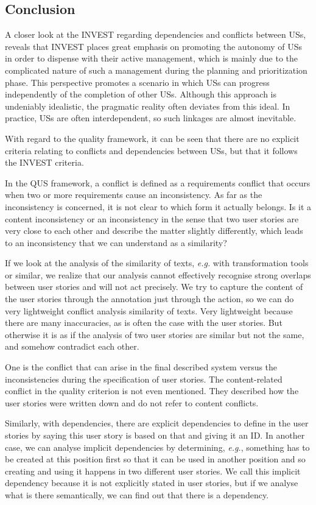 \subsection{Conclusion} \label{usq_conclusion}
A closer look at the INVEST regarding dependencies and conflicts between USs, reveals that INVEST places great emphasis on promoting the autonomy of USs in order to dispense with their active management, which is mainly due to the complicated nature of such a management during the planning and prioritization phase. This perspective promotes a scenario in which USs can progress independently of the completion of other USs. Although this approach is undeniably idealistic, the pragmatic reality often deviates from this ideal. In practice, USs are often interdependent, so such linkages are almost inevitable. 

With regard to the quality framework, it can be seen that there are no explicit criteria relating to conflicts and dependencies between USs, but that it follows the INVEST criteria.

In the QUS framework, a conflict is defined as a requirements conflict that occurs when two or more requirements cause an inconsistency. As far as the inconsistency is concerned, it is not clear to which form it actually belongs. Is it a content inconsistency or an inconsistency in the sense that two user stories are very close to each other and describe the matter slightly differently, which leads to an inconsistency that we can understand as a similarity?

If we look at the analysis of the similarity of texts, \emph{e.g.} with transformation tools or similar, we realize that our analysis cannot effectively recognise strong overlaps between user stories and will not act precisely. We try to capture the content of the user stories through the annotation just through the action, so we can do very lightweight conflict analysis similarity of texts. Very lightweight because there are many inaccuracies, as is often the case with the user stories. But otherwise it is as if the analysis of two user stories are similar but not the same, and somehow contradict each other. 

One is the conflict that can arise in the final described system versus the inconsistencies during the specification of user stories. The content-related conflict in the quality criterion is not even mentioned. They described how the user stories were written down and do not refer to content conflicts. 

Similarly, with dependencies, there are explicit dependencies to define in the user stories by saying this user story is based on that and giving it an ID. In another case, we can analyse implicit dependencies by determining, \emph{e.g.}, something has to be created at this position first so that it can be used in another position and so creating and using it happens in two different user stories. We call this implicit dependency because it is not explicitly stated in user stories, but if we analyse what is there semantically, we can find out that there is a dependency.

